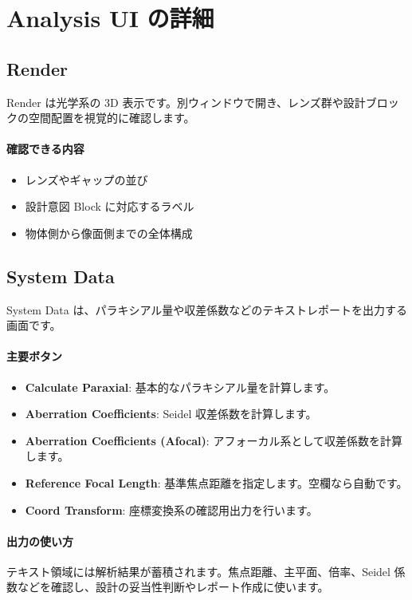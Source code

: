 \documentclass[11pt]{article}
\begin{document}
\section{Analysis UI の詳細}
\subsection{Render}
Render は光学系の 3D 表示です。別ウィンドウで開き、レンズ群や設計ブロックの空間配置を視覚的に確認します。

\paragraph{確認できる内容}
\begin{itemize}
  \item レンズやギャップの並び
  \item 設計意図 Block に対応するラベル
  \item 物体側から像面側までの全体構成
\end{itemize}

\subsection{System Data}
System Data は、パラキシアル量や収差係数などのテキストレポートを出力する画面です。

\paragraph{主要ボタン}
\begin{itemize}
  \item \textbf{Calculate Paraxial}: 基本的なパラキシアル量を計算します。
  \item \textbf{Aberration Coefficients}: Seidel 収差係数を計算します。
  \item \textbf{Aberration Coefficients (Afocal)}: アフォーカル系として収差係数を計算します。
  \item \textbf{Reference Focal Length}: 基準焦点距離を指定します。空欄なら自動です。
  \item \textbf{Coord Transform}: 座標変換系の確認用出力を行います。
\end{itemize}

\paragraph{出力の使い方}
テキスト領域には解析結果が蓄積されます。焦点距離、主平面、倍率、Seidel 係数などを確認し、設計の妥当性判断やレポート作成に使います。
\end{document}
